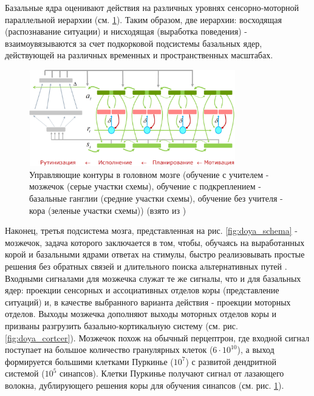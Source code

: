 \documentclass[12pt]{report}
\begin{document}
	Базальные ядра оценивают действия на различных уровнях сенсорно-моторной параллельной иерархии (см. \ref{fig:shumsky_schemas}). Таким образом, две иерархии: восходящая (распознавание ситуации) и нисходящая (выработка поведения) - взаимоувязываются за счет подкорковой подсистемы базальных ядер, действующей на различных временных и пространственных масштабах.
	\begin{figure}
		\centering
		\includegraphics[width=0.8\textwidth]{misc/phisio/shumsky_schema}
		\caption{Управляющие контуры в головном мозге (обучение с учителем - мозжечок (серые участки схемы), обучение с подкреплением - базальные ганглии (средние участки схемы), обучение без учителя - кора (зеленые участки схемы)) (взято из \cite{Shumsky2015b})}
		\label{fig:shumsky_schemas}		
	\end{figure}

	Наконец, третья подсистема мозга, представленная на рис. \ref{fig:doya_schema} - мозжечок, задача которого заключается в том, чтобы, обучаясь на выработанных корой и базальными ядрами ответах на стимулы, быстро реализовывать простые решения без обратных связей и длительного поиска альтернативных путей \cite{Kawato2009}. Входными сигналами для мозжечка служат те же сигналы, что и для базальных ядер: проекции сенсорных и ассоциативных отделов коры (представление ситуаций) и, в качестве выбранного варианта действия -  проекции моторных отделов. Выходы мозжечка дополняют выходы моторных отделов коры и призваны разгрузить базально-кортикальную систему (см. рис. \ref{fig:doya_cortcer}). Мозжечок похож на обычный перцептрон, где входной сигнал поступает на большое количество гранулярных клеток ($6\cdot10^{10}$), а выход формируется большими клетками Пуркинье ($10^7$) с развитой дендритной системой ($10^5$ синапсов). Клетки Пуркинье получают сигнал от лазающего волокна, дублирующего решения коры для обучения синапсов (см. рис. \ref{fig:shumsky_schemas}).
	
\end{document}
